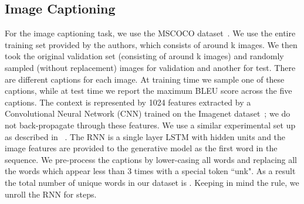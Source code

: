 \documentclass{article} \usepackage{iclr2016_conference,times}
\begin{document}
\subsection{Image Captioning}
For the image captioning task, we use the MSCOCO
dataset~\citep{mscoco}. We use the entire training set provided by the authors, which consists of around k images. We then took the original validation set (consisting of around k images) and randomly sampled (without replacement)  images for validation and another  for test. 
There are  different captions for each image. 
At training time we sample one of
these captions, while at test time we report the maximum BLEU score across the five captions.
The context is represented by 1024 features extracted by a Convolutional Neural Network (CNN) trained
on the Imagenet dataset~\citep{imagenet_cvpr09}; we do not back-propagate through these features. We use a similar experimental set up as described in ~\citet{sbengio-nips2015}. The RNN is a single layer LSTM with 
 hidden units and the image features are provided to the generative model as the first word in the sequence. We pre-process the captions by lower-casing all words and replacing all the words which appear less than 3 times with a special token ``unk". As a result the total number of unique words in our dataset is . Keeping in mind the  rule, we unroll the RNN for  steps.
\end{document}

